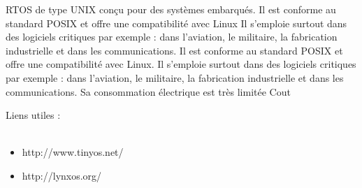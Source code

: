 {RTOS de type UNIX conçu pour des systèmes embarqués. Il est conforme au standard POSIX et offre une compatibilité avec Linux}
{Il s'emploie surtout dans des logiciels critiques par exemple : dans l'aviation, le militaire, la fabrication industrielle et dans les communications.
Il est conforme au standard POSIX et offre une compatibilité avec Linux. Il s'emploie surtout dans des logiciels critiques par exemple : dans l'aviation, le militaire, la fabrication industrielle et dans les communications.}
{Sa consommation électrique est très limitée}
{Cout}
{}
{}


Liens utiles : \\~
\begin {itemize}
	\item http://www.tinyos.net/
	\item http://lynxos.org/
\end {itemize}


